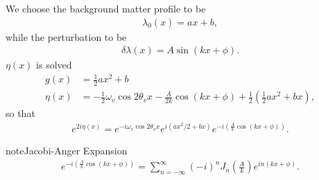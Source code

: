 \documentclass[letterpaper,12pt,english]{sphinxmanual}
\begin{document}
We choose the background matter profile to be
\begin{equation*}
\begin{split}\lambda_0(x) = a x + b,\end{split}
\end{equation*}
while the perturbation to be
\begin{equation*}
\begin{split}\delta \lambda(x) = A\sin (kx + \phi).\end{split}
\end{equation*}
\(\eta(x)\) is solved
\begin{equation*}
\begin{split}g(x) & = \frac{1}{2} ax^2+b \\
\eta(x) &= - \frac{1}{2} \omega_v \cos 2\theta_v x - \frac{A}{2k} \cos (kx + \phi) + \frac{1}{2} \left( \frac{1}{2}a x^2 + b x \right),\end{split}
\end{equation*}
so that
\begin{equation*}
\begin{split}e^{2i\eta(x)} = e^{-i \omega_v \cos 2\theta_v x} e^{i ( ax^2/2+ bx )} e^{-i\left( \frac{A}{k} \cos (kx+\phi) \right)}.\end{split}
\end{equation*}
\begin{sphinxadmonition}{note}{Jacobi-Anger Expansion}
\begin{equation*}
\begin{split}e^{-i\left( \frac{A}{k} \cos (kx+\phi) \right)} = \sum_{n=-\infty}^{\infty} (-i)^n J_n\left(\frac{A}{k}\right) e^{in(kx+\phi)}.\end{split}
\end{equation*}\end{sphinxadmonition}
\end{document}
